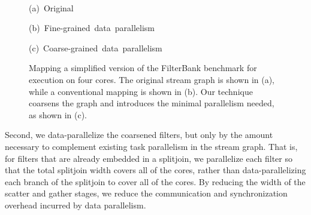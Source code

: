 \begin{figure}[t]

\begin{minipage}{0.3\textwidth}
\centering
{}
\end{minipage}
\hspace{0.1in}
\begin{minipage}{0.3\textwidth}
\centering
{}
\end{minipage}
\hspace{0.4in}
\begin{minipage}{0.3\textwidth}
\centering
{}
\end{minipage}

~ \\
\begin{minipage}{0.3\textwidth}
\centering
\mbox{{\small (a) Original}}
\end{minipage}
\hspace{0.1in}
\begin{minipage}{0.3\textwidth}
\mbox{{\small (b) Fine-grained data parallelism}}
\end{minipage}
\hspace{0.4in}
\begin{minipage}{0.3\textwidth}
\hspace{-14pt}\mbox{{\small (c) Coarse-grained data parallelism}}
\end{minipage}

\centering
\caption[Exploiting data parallelism in the FilterBank
  benchmark.]{Mapping a simplified version of the FilterBank benchmark
  for execution on four cores.  The original stream graph is shown in
  (a), while a conventional mapping is shown in (b).  Our technique
  coarsens the graph and introduces the minimal parallelism needed, as
  shown in (c).\protect\label{fig:filterbank}}

\end{figure}

Second, we data-parallelize the coarsened filters, but only by the
amount necessary to complement existing task parallelism in the stream
graph.  That is, for filters that are already embedded in a splitjoin,
we parallelize each filter so that the total splitjoin width covers
all of the cores, rather than data-parallelizing each branch of the
splitjoin to cover all of the cores.  By reducing the width of the
scatter and gather stages, we reduce the communication and
synchronization overhead incurred by data parallelism.


